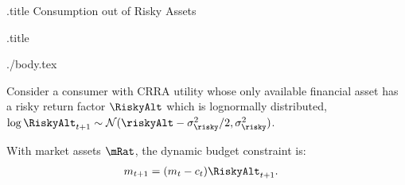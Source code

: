 \documentclass{handout}
\begin{document}
\begin{verbatimwrite}{\jobname.title}
Consumption out of Risky Assets
\end{verbatimwrite}

\handoutHeader

\centerline{\LARGE  \jobname.title}\vspace{.15in}

\begin{verbatimwrite}{./body.tex}

Consider a consumer with CRRA utility whose only available financial asset has a risky return factor
  $\RiskyAlt$ which is lognormally distributed, $\log
  \RiskyAlt_{t+1} \sim \mathcal{N}({\riskyAlt} -
  \sigma_{\risky}^{2}/2,\sigma_{\risky}^{2})$.

With market assets $\mRat$, the dynamic budget constraint is:
\begin{equation}\begin{gathered}\begin{aligned}
        {m}_{t+1} & =  ({m}_{t}-c_{t})\RiskyAlt_{t+1}.
\end{aligned}\end{gathered}\end{equation}


\end{verbatimwrite}
\end{document}
